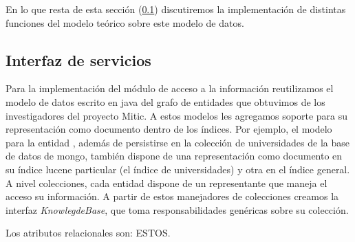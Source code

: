 En lo que resta de esta sección (\ref{subsec:modelos-db}) discutiremos la implementación de distintas funciones del modelo teórico sobre este modelo de datos.








\subsection{Interfaz de servicios}
\label{subsec:modelos-db}

Para la implementación del módulo de acceso a la información reutilizamos el modelo de datos escrito en java del grafo de entidades que obtuvimos de los investigadores del proyecto Mitic. A estos modelos les agregamos soporte para su representación como documento dentro de los índices. Por ejemplo, el modelo para la entidad , además de persistirse en la colección de universidades de la base de datos de mongo, también dispone de una representación como documento en su índice lucene particular (el índice de universidades) y otra en el índice general. A nivel colecciones, cada entidad dispone de un representante que maneja el acceso su información. A partir de estos manejadores de colecciones creamos la interfaz \emph{KnowlegdeBase}, que toma responsabilidades genéricas sobre su colección.

Los atributos relacionales son: {\color{red}ESTOS}.

